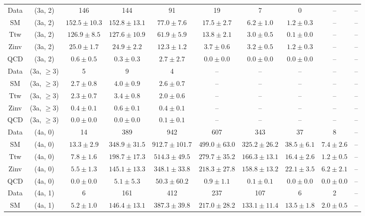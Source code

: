 \begin{table}[h!]
{\begin{tabular}{cccccccccc}
	Data & (3a, 2) & 146 & 144 & 91 & 19 & 7 & 0 & -- & -- \\[0.5ex] 
	SM & (3a, 2) & $152.5\pm 10.3$ & $152.8\pm 13.1$ & $77.0\pm 7.6$ & $17.5\pm 2.7$ & $6.2\pm 1.0$ & $1.2\pm 0.3$ & -- & -- \\[0.5ex] 
	Ttw & (3a, 2) & $126.9\pm 8.5$ & $127.6\pm 10.9$ & $61.9\pm 5.9$ & $13.8\pm 2.1$ & $3.0\pm 0.5$ & $0.1\pm 0.0$ & -- & -- \\[0.5ex] 
	Zinv & (3a, 2) & $25.0\pm 1.7$ & $24.9\pm 2.2$ & $12.3\pm 1.2$ & $3.7\pm 0.6$ & $3.2\pm 0.5$ & $1.2\pm 0.3$ & -- & -- \\[0.5ex] 
	QCD & (3a, 2) & $0.6\pm 0.5$ & $0.3\pm 0.3$ & $2.7\pm 2.7$ & $0.0\pm 0.0$ & $0.0\pm 0.0$ & $0.0\pm 0.0$ & -- & -- \\[0.5ex] 
	Data & (3a, $\ge3$) & 5 & 9 & 4 & -- & -- & -- & -- & -- \\[0.5ex] 
	SM & (3a, $\ge3$) & $2.7\pm 0.8$ & $4.0\pm 0.9$ & $2.6\pm 0.7$ & -- & -- & -- & -- & -- \\[0.5ex] 
	Ttw & (3a, $\ge3$) & $2.3\pm 0.7$ & $3.4\pm 0.8$ & $2.0\pm 0.6$ & -- & -- & -- & -- & -- \\[0.5ex] 
	Zinv & (3a, $\ge3$) & $0.4\pm 0.1$ & $0.6\pm 0.1$ & $0.4\pm 0.1$ & -- & -- & -- & -- & -- \\[0.5ex] 
	QCD & (3a, $\ge3$) & $0.0\pm 0.0$ & $0.0\pm 0.0$ & $0.1\pm 0.1$ & -- & -- & -- & -- & -- \\[0.5ex] 
	Data & (4a, 0) & 14 & 389 & 942 & 607 & 343 & 37 & 8 & -- \\[0.5ex] 
	SM & (4a, 0) & $13.3\pm 2.9$ & $348.9\pm 31.5$ & $912.7\pm 101.7$ & $499.0\pm 63.0$ & $325.2\pm 26.2$ & $38.5\pm 6.1$ & $7.4\pm 2.6$ & -- \\[0.5ex] 
	Ttw & (4a, 0) & $7.8\pm 1.6$ & $198.7\pm 17.3$ & $514.3\pm 49.5$ & $279.7\pm 35.2$ & $166.3\pm 13.1$ & $16.4\pm 2.6$ & $1.2\pm 0.5$ & -- \\[0.5ex] 
	Zinv & (4a, 0) & $5.5\pm 1.3$ & $145.1\pm 13.3$ & $348.1\pm 33.8$ & $218.3\pm 27.8$ & $158.8\pm 13.2$ & $22.1\pm 3.5$ & $6.2\pm 2.1$ & -- \\[0.5ex] 
	QCD & (4a, 0) & $0.0\pm 0.0$ & $5.1\pm 5.3$ & $50.3\pm 60.2$ & $0.9\pm 1.1$ & $0.1\pm 0.1$ & $0.0\pm 0.0$ & $0.0\pm 0.0$ & -- \\[0.5ex] 
	Data & (4a, 1) & 6 & 161 & 412 & 237 & 107 & 6 & 2 & -- \\[0.5ex] 
	SM & (4a, 1) & $5.2\pm 1.0$ & $146.4\pm 13.1$ & $387.3\pm 39.8$ & $217.0\pm 28.2$ & $133.1\pm 11.4$ & $13.5\pm 1.8$ & $2.0\pm 0.5$ & -- \\[0.5ex] 

\end{tabular}}
\end{table}

